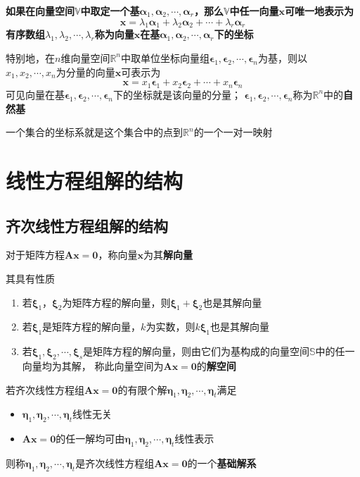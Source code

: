 \documentclass[UTF8]{ctexart}
\newcommand{\ve}[1]{{\bm{#1}}}
\newcommand{\mat}[1]{\ve{#1}}
\newcommand{\set}[1]{{\mathbb{#1}}}
\newcommand{\emplin}{\vspace{1em}}
\begin{document}
\emplin
\emplin

\textbf{如果在向量空间$\set{V}$中取定一个基$\mat{\alpha}_1,\mat{\alpha}_2,\cdots,\mat{\alpha}_r$，那么$\set{V}$中任一向量$\mat{x}$可唯一地表示为
\[\mat{x}=\lambda_1\mat{\alpha}_1+\lambda_2\mat{\alpha}_2+\cdots+\lambda_r\mat{\alpha}_r\]
有序数组$\lambda_1,\lambda_2,\cdots,\lambda_r$称为向量$\mat{x}$在基$\mat{\alpha}_1,\mat{\alpha}_2,\cdots,\mat{\alpha}_r$下的坐标}

特别地，在$n$维向量空间$\set{R}^n$中取单位坐标向量组$\mat{\epsilon}_1,\mat{\epsilon}_2,\cdots,\mat{\epsilon}_n$为基，则以
$x_1,x_2,\cdots,x_n$为分量的向量$\mat{x}$可表示为
\[\mat{x}=x_1\mat{\epsilon}_1+x_2\mat{\epsilon}_2+\cdots+x_n\mat{\epsilon}_n\]
可见向量在基$\mat{\epsilon}_1,\mat{\epsilon}_2,\cdots,\mat{\epsilon}_n$下的坐标就是该向量的分量；
$\mat{\epsilon}_1,\mat{\epsilon}_2,\cdots,\mat{\epsilon}_n$称为$\set{R}^n$中的\textbf{自然基}

一个集合的坐标系就是这个集合中的点到$\set{R}^n$的一个一对一映射

\section*{线性方程组解的结构}
\subsection*{齐次线性方程组解的结构}
对于矩阵方程$\mat{A}\mat{x}=\mat{0}$，称向量$\mat{x}$为其\textbf{解向量}

\emplin

其具有性质
\begin{enumerate}
  \item 若$\mat{\xi}_1$，$\mat{\xi}_2$为矩阵方程的解向量，则$\mat{\xi}_1+\mat{\xi}_2$也是其解向量
  \item 若$\mat{\xi}_1$是矩阵方程的解向量，$k$为实数，则$k\mat{\xi}_1$也是其解向量
  \item 若$\mat{\xi}_1,\mat{\xi}_2,\cdots,\mat{\xi}_s$是矩阵方程的解向量，则由它们为基构成的向量空间$\set{S}$中的任一向量均为其解，
  称此向量空间为$\mat{A}\mat{x}=\mat{0}$的\textbf{解空间}
\end{enumerate}

\emplin
\emplin

若齐次线性方程组$\mat{A}\mat{x}=\mat{0}$的有限个解$\mat{\eta}_1,\mat{\eta}_2,\cdots,\mat{\eta}_t$满足
\begin{itemize}
  \item $\mat{\eta}_1,\mat{\eta}_2,\cdots,\mat{\eta}_t$线性无关
  \item $\mat{A}\mat{x}=\mat{0}$的任一解均可由$\mat{\eta}_1,\mat{\eta}_2,\cdots,\mat{\eta}_t$线性表示
\end{itemize}
则称$\mat{\eta}_1,\mat{\eta}_2,\cdots,\mat{\eta}_t$是齐次线性方程组$\mat{A}\mat{x}=\mat{0}$的一个\textbf{基础解系}
\end{document}
